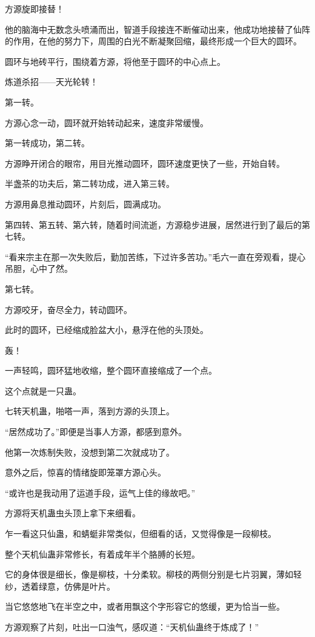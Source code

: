 \begin{this_body}
方源旋即接替！

他的脑海中无数念头喷涌而出，智道手段接连不断催动出来，他成功地接替了仙阵的作用，在他的努力下，周围的白光不断凝聚回缩，最终形成一个巨大的圆环。

圆环与地砖平行，围绕着方源，将他至于圆环的中心点上。

炼道杀招——天光轮转！

第一转。

方源心念一动，圆环就开始转动起来，速度非常缓慢。

第一转成功，第二转。

方源睁开闭合的眼帘，用目光推动圆环，圆环速度更快了一些，开始自转。

半盏茶的功夫后，第二转功成，进入第三转。

方源用鼻息推动圆环，片刻后，圆满成功。

第四转、第五转、第六转，随着时间流逝，方源稳步进展，居然进行到了最后的第七转。

“看来宗主在那一次失败后，勤加苦练，下过许多苦功。”毛六一直在旁观看，提心吊胆，心中了然。

第七转。

方源咬牙，奋尽全力，转动圆环。

此时的圆环，已经缩成脸盆大小，悬浮在他的头顶处。

轰！

一声轻鸣，圆环猛地收缩，整个圆环直接缩成了一个点。

这个点就是一只蛊。

七转天机蛊，啪嗒一声，落到方源的头顶上。

“居然成功了。”即便是当事人方源，都感到意外。

他第一次炼制失败，没想到第二次就成功了。

意外之后，惊喜的情绪旋即笼罩方源心头。

“或许也是我动用了运道手段，运气上佳的缘故吧。”

方源将天机蛊虫头顶上拿下来细看。

乍一看这只仙蛊，和蜻蜓非常类似，但细看的话，又觉得像是一段柳枝。

整个天机仙蛊非常修长，有着成年半个胳膊的长短。

它的身体很是细长，像是柳枝，十分柔软。柳枝的两侧分别是七片羽翼，薄如轻纱，透着绿意，仿佛是叶片。

当它悠悠地飞在半空之中，或者用飘这个字形容它的悠缓，更为恰当一些。

方源观察了片刻，吐出一口浊气，感叹道：“天机仙蛊终于炼成了！”

\end{this_body}

